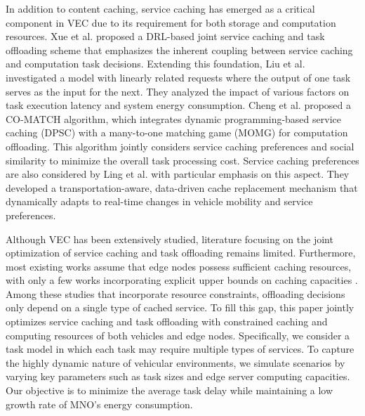 \documentclass[lettersize,journal]{IEEEtran}
\begin{document}
In addition to content caching, service caching has emerged as a critical component in VEC due to its requirement for both storage and computation resources.
Xue et al. \cite{XueLiu-18} proposed a DRL-based joint service caching and task offloading scheme that emphasizes the inherent coupling between service caching and computation task decisions.
% 
Extending this foundation, Liu et al. \cite{L.Z.-4} investigated a model with linearly related requests where the output of one task serves as the input for the next. They analyzed the impact of various factors on task execution latency and system energy consumption.
% 
Cheng et al. \cite{ChengZhai-36} proposed a CO-MATCH algorithm, which integrates dynamic programming-based service caching (DPSC) with a many-to-one matching game (MOMG) for computation offloading. This algorithm jointly considers service caching preferences and social similarity to minimize the overall task processing cost.
% 
Service caching preferences are also considered by  Ling et al. \cite{LingZhang-21}  with particular emphasis on this aspect. They developed a transportation-aware, data-driven cache replacement mechanism that dynamically adapts to real-time changes in vehicle mobility and service preferences.
% 

Although VEC has been extensively studied, literature focusing on the joint optimization of service caching and task offloading remains limited. 
Furthermore, most existing works assume that edge nodes possess sufficient  caching resources, with only a few works incorporating explicit upper bounds on caching capacities \cite{XueLiu-18,L.Z.-4}.
Among these studies that incorporate resource constraints, offloading decisions only depend on a single type of cached service.
To fill this gap, this paper jointly optimizes service caching and task offloading with constrained caching and computing resources of both vehicles and edge nodes. 
Specifically, we consider a task model in which each task may require multiple types of services. To capture the highly dynamic nature of vehicular environments, we simulate scenarios by varying key parameters such as task sizes and edge server computing capacities. Our objective is to minimize the average task delay while maintaining a low growth rate of MNO's energy consumption.
\end{document}

